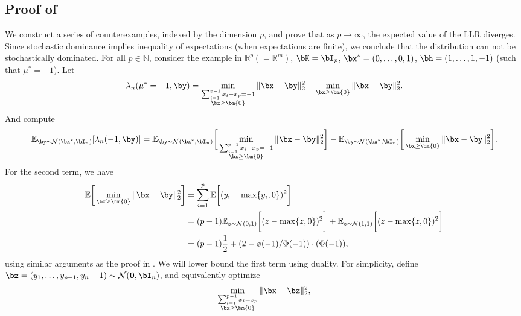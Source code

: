 \documentclass[11pt]{article}
\numberwithin{equation}{section}
\numberwithin{figure}{section}
\begin{document}
\subsection{Proof of }
\label{proof:dimbounding}
 We construct a series of counterexamples, indexed by the dimension $p$, and prove that as $p \rightarrow \infty$, the expected value of the LLR diverges. Since stochastic dominance implies inequality of expectations (when expectations are finite), we conclude that the distribution can not be stochastically dominated.
For all $p \in \mathbb{N}$, consider the example in $\mathbb{R}^p (= \mathbb{R}^m)$, $\bK = \bI_p$, $\bx^* = (0,\ldots,0, 1)$, $\bh = (1,\ldots,1,-1)$ (such that $\mu^* = -1$). Let 
\begin{equation}
    \lambda_n(\mu^* = -1, \by) = \min_{\substack{\sum_{i =1}^{p-1}x_i -x_{p} = -1\\ \bx \geq \bm{0}}} \Vert \bx -\by \Vert^2_2 - \min_{\bx \geq \bm{0} } \Vert \bx-\by \Vert^2_2.
\end{equation}
And compute
\begin{equation}    
\mathbb{E}_{\by \sim \mathcal N(\bx^*, \bI_n)}[\lambda_n(-1, \by)] = \mathbb{E}_{\by \sim \mathcal N(\bx^*, \bI_n)}\bigg [\min_{\substack{\sum_{i =1}^{p-1}x_i -x_{p} = -1\\ \bx \geq \bm{0}}} \Vert \bx -\by \Vert^2_2\bigg]  - \mathbb{E}_{\by \sim \mathcal N(\bx^*, \bI_n)}\bigg[\min_{\bx \geq \bm{0} } \Vert \bx-\by \Vert^2_2\bigg].
\end{equation}
For the second term, we have
\begin{align*}
     \mathbb{E} \bigg [\min_{\bx \geq \bm{0} } \Vert \bx -\by \Vert^2_2\bigg ] &=  \sum_{i=1}^p  \mathbb{E} \bigg [ (y_i - \max\{y_i, 0\})^2\bigg ] \\
     &= (p-1) \mathbb{E}_{z \sim \mathcal N(0,1)} \bigg[ (z-\max\{z,0\})^2 \bigg ] + \mathbb{E}_{z \sim \mathcal N(1,1)} \bigg[ (z-\max\{z,0\})^2 \bigg ] \\ 
&= (p-1)\dfrac{1}{2} + (2- \phi(-1)/\Phi(-1))\cdot(\Phi(-1)),
\end{align*}
using similar arguments as the proof in . We will lower bound the first term using duality. For simplicity, define $\bz = (y_1, \ldots, y_{p-1}, y_n-1) \sim \mathcal N(\mathbf{0}, \bI_n)$, and equivalently optimize
\begin{equation}
\min_{\substack{\sum_{i =1}^{p-1}x_i = x_{p}\\ \bx \geq \bm{0}}} \Vert \bx -\bz \Vert^2_2,
\end{equation}
\end{document}
